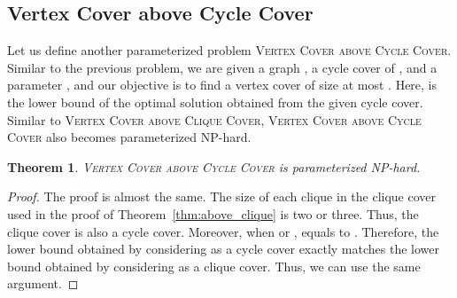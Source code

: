 \documentclass[11pt]{article}
\newtheorem{theorem}{Theorem}
\begin{document}
\subsection{Vertex Cover above Cycle Cover}

Let us define another parameterized problem \textsc{Vertex Cover above Cycle Cover}.
Similar to the previous problem, we are given a graph , a cycle cover  of ,
and a parameter , and our objective is to find a vertex cover of size at most
.
Here,  is the lower bound of the optimal solution obtained
from the given cycle cover.
Similar to \textsc{Vertex Cover above Clique Cover}, \textsc{Vertex Cover above Cycle Cover} also becomes parameterized
NP-hard.

\begin{theorem}\label{thm:above_cycle}
\textsc{Vertex Cover above Cycle Cover} is parameterized NP-hard.
\end{theorem}

\begin{proof}
The proof is almost the same.
The size of each clique  in the clique cover  used in the proof of Theorem~\ref{thm:above_clique} is two
or three.
Thus, the clique cover  is also a cycle cover.
Moreover, when  or ,  equals to .
Therefore, the lower bound obtained by considering  as a cycle cover exactly matches the lower bound
obtained by considering  as a clique cover.
Thus, we can use the same argument.
\end{proof}
 
\end{document}

